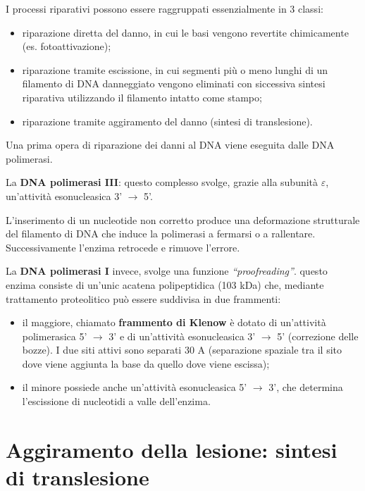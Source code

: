 \documentclass[11pt]{book}
\begin{document}
I processi riparativi possono essere raggruppati essenzialmente in 3
classi:

\begin{itemize}
\itemsep1pt\parskip0pt
\item
  riparazione diretta del danno, in cui le basi vengono revertite
  chimicamente (es. fotoattivazione);
\item
  riparazione tramite escissione, in cui segmenti più o meno lunghi di
  un filamento di DNA danneggiato vengono eliminati con siccessiva
  sintesi riparativa utilizzando il filamento intatto come stampo;
\item
  riparazione tramite aggiramento del danno (sintesi di translesione).
\end{itemize}

Una prima opera di riparazione dei danni al DNA viene eseguita dalle DNA
polimerasi.

La \textbf{DNA polimerasi III}: questo complesso svolge, grazie alla
subunità \(\varepsilon\), un'attività esonucleasica 3' \(\rightarrow\)
5'.

L'inserimento di un nucleotide non corretto produce una deformazione
strutturale del filamento di DNA che induce la polimerasi a fermarsi o a
rallentare. Successivamente l'enzima retrocede e rimuove l'errore.

La \textbf{DNA polimerasi I} invece, svolge una funzione
\emph{``proofreading''}. questo enzima consiste di un'unic acatena
polipeptidica (103 kDa) che, mediante trattamento proteolitico può
essere suddivisa in due frammenti:

\begin{itemize}
\itemsep1pt\parskip0pt
\item
  il maggiore, chiamato \textbf{frammento di Klenow} è dotato di
  un'attività polimerasica 5' \(\rightarrow\) 3' e di un'attività
  esonucleasica 3' \(\rightarrow\) 5' (correzione delle bozze). I due
  siti attivi sono separati 30 A (separazione spaziale tra il sito dove
  viene aggiunta la base da quello dove viene escissa);
\item
  il minore possiede anche un'attività esonucleasica 5' \(\rightarrow\)
  3', che determina l'escissione di nucleotidi a valle dell'enzima.
\end{itemize}

\section{Aggiramento della lesione: sintesi di
translesione}\label{aggiramento-della-lesione-sintesi-di-translesione}
\end{document}
